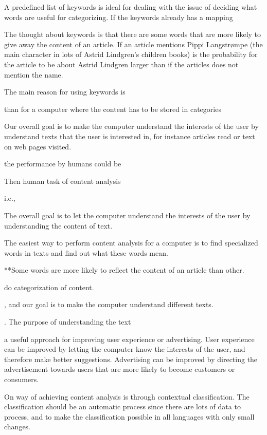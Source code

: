 \documentclass[11pt,english,a4paper]{article}
\begin{document}
A predefined list of keywords is ideal for dealing with the issue of deciding what words are useful for categorizing. If the keywords already has a mapping


The thought about keywords is that there are some words that are more likely to give away the content of an article. If an article mentions Pippi Langstrømpe (the main character in lots of Astrid Lindgren's children books) is the probability for the article to be about Astrid Lindgren larger than if the articles does not mention the name. 

The main reason for using keywords is


than for a computer where the content has to be stored in categories


Our overall goal is to make the computer understand the interests of the user by understand texts that the user is interested in, for instance articles read or text on web pages visited. 


the performance by humans could be 

Then human task of content analysis 


i.e., 



The overall goal is to let the computer understand the interests of the user by understanding the content of text. 

The easiest way to perform content analysis for a computer is to find specialized words in texts and find out what these words mean. 

**Some words are more likely to reflect the content of an article than other. 




do categorization of content. 

, and our goal is to make the computer understand different texts. 

. The purpose of understanding the text  




a useful approach for improving user experience or advertising. User experience can be improved by letting the computer know the interests of the user, and therefore make better suggestions. Advertising can be improved by directing the advertisement towards users that are more likely to become customers or consumers. 


On way of achieving content analysis is through contextual classification.  The classification should be an automatic process since there are lots of data to process, and to make the classification possible in all languages with only small changes. 
\end{document}
